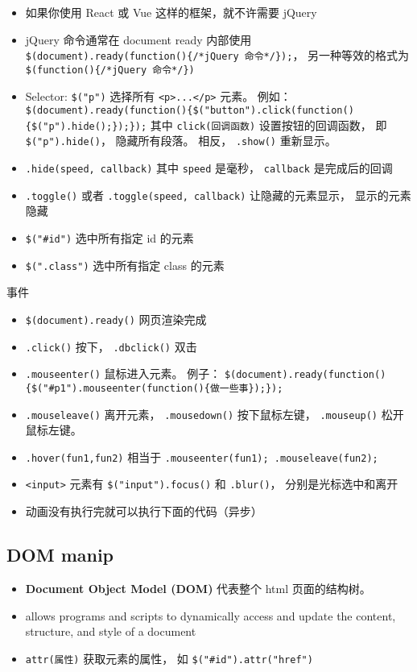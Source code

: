 
\begin{issues}
\issueDraft
\end{issues}


\begin{itemize}
\item 如果你使用 React 或 Vue 这样的框架，就不许需要 jQuery
\item jQuery 命令通常在 document ready 内部使用 \verb`$(document).ready(function(){/*jQuery 命令*/});`， 另一种等效的格式为 \verb`$(function(){/*jQuery 命令*/})`
\item Selector: \verb`$("p")` 选择所有 \verb`<p>...</p>` 元素。 例如： \verb`$(document).ready(function(){$("button").click(function(){$("p").hide();});});` 其中 \verb`click(回调函数)` 设置按钮的回调函数， 即 \verb`$("p").hide()`， 隐藏所有段落。 相反， \verb`.show()` 重新显示。
\item \verb`.hide(speed, callback)` 其中 \verb`speed` 是毫秒， \verb`callback` 是完成后的回调
\item \verb`.toggle()` 或者 \verb`.toggle(speed, callback)` 让隐藏的元素显示， 显示的元素隐藏
\item \verb`$("#id")` 选中所有指定 id 的元素
\item \verb`$(".class")` 选中所有指定 class 的元素
\end{itemize}

事件
\begin{itemize}
\item \verb`$(document).ready()` 网页渲染完成
\item \verb`.click()` 按下， \verb`.dbclick()` 双击
\item \verb`.mouseenter()` 鼠标进入元素。 例子： \verb`$(document).ready(function(){$("#p1").mouseenter(function(){做一些事});});`
\item \verb`.mouseleave()` 离开元素， \verb`.mousedown()` 按下鼠标左键， \verb`.mouseup()` 松开鼠标左键。
\item \verb`.hover(fun1,fun2)` 相当于 \verb`.mouseenter(fun1); .mouseleave(fun2);`
\item \verb`<input>` 元素有 \verb`$("input").focus()` 和 \verb`.blur()`， 分别是光标选中和离开
\item 动画没有执行完就可以执行下面的代码（异步）
\end{itemize}

\subsection{DOM manip}
\begin{itemize}
\item \textbf{Document Object Model (DOM)} 代表整个 html 页面的结构树。
\item allows programs and scripts to dynamically access and update the content, structure, and style of a document
\item \verb`attr(属性)` 获取元素的属性， 如 \verb`$("#id").attr("href")`
\end{itemize}

